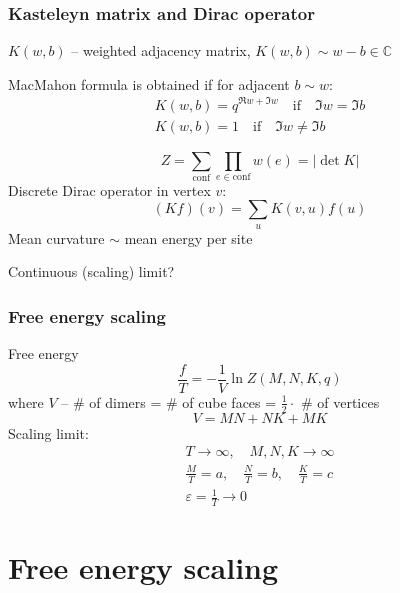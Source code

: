\documentclass[pdftex]{beamer}
\newcommand{\gf}{\mathfrak{g}}
\theoremstyle{definition} \newtheorem{Def}{Definition}
\begin{document}
\begin{frame}
  \frametitle{Kasteleyn matrix and Dirac operator}

  $K(w,b)$ -- weighted adjacency matrix, $K(w,b)\sim w-b\in \mathbb{C}$

  MacMahon formula is obtained if for adjacent $b\sim w$:
  \begin{eqnarray}
    \label{eq:18}
    K(w,b)=q^{\Re w+\Im w} \quad \mathrm{if}\quad \Im w=\Im b\\
    K(w,b)=1 \quad \mathrm{if}\quad \Im w\neq\Im b
  \end{eqnarray}

  \begin{equation}
    \label{eq:15}
    Z=\sum_{\mathrm{conf}}\prod_{e\in \mathrm{conf}}w(e)=|\det K|
  \end{equation}
  Discrete Dirac operator in vertex $v$:
  \begin{equation}
    \label{eq:16}
    (Kf)(v)=\sum_{u}K(v,u) f(u)
  \end{equation}
  Mean curvature $\sim$ mean energy per site

  Continuous (scaling) limit?
\end{frame}
\begin{frame}
  \frametitle{Free energy scaling}
  Free energy
  \begin{equation}
    \label{eq:17}
    \frac{f}{T}=-\frac{1}{V}\ln Z(M,N,K,q)
  \end{equation}
  where $V$ -- \# of dimers = \# of cube faces = $\frac{1}{2}\cdot$ \# of vertices
  \begin{equation}
    \label{eq:19}
    V=MN+NK+MK
  \end{equation}
  Scaling limit:
  \begin{eqnarray}
    \label{eq:20}
    T\to \infty, \quad M,N,K\to \infty\\
    \frac{M}{T}=a,\quad \frac{N}{T}=b, \quad \frac{K}{T}=c\\
        \varepsilon=\frac{1}{T}\to 0
  \end{eqnarray}

\end{frame}
\section{Free energy scaling}
\label{sec:free-energy-scaling}
\end{document}
